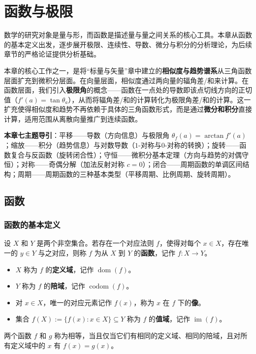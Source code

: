 \chapter{函数与极限}

\begin{remark}[本章定位]\label{rem:function_chapter_positioning}
数学的研究对象是量与形，而函数是描述量与量之间关系的核心工具。本章从函数的基本定义出发，逐步展开极限、连续性、导数、微分与积分的分析理论，为后续章节的严格论证提供分析基础。

本章的核心工作之一，是将“标量与矢量”章中建立的\textbf{相似度与趋势谱系}从三角函数层面扩充到微积分层面。在向量层面，相似度通过两向量的辐角差/和来计算。在函数层面，我们引入\textbf{极限角}的概念——函数在一点处的导数即该点切线方向的正切值（$f'(a) = \tan\theta_a$），从而将辐角差/和的计算转化为极限角差/和的计算。这一扩充使得相似度和趋势不再依赖于具体的三角函数形式，而是通过\textbf{微分和积分}直接计算，适用范围从离散向量推广到连续函数。

\textbf{本章七主题导引}：平移——导数（方向信息）与极限角 $\theta_f(a)=\arctan f'(a)$；缩放——积分（趋势信息）与对数导数（$1$-对称与$0$-对称的转换）；旋转——函数复合与反函数（旋转闭合性）；守恒——微积分基本定理（方向与趋势的对偶守恒）；对称——奇偶分解（加法反射对称 $c=0$）；闭合——周期函数的单调区间结构；周期——周期函数的三种基本类型（平移周期、比例周期、旋转周期）。
\end{remark}

\section{\texorpdfstring{函数}{函数}}

\subsection{\texorpdfstring{函数的基本定义}{函数的基本定义}}

\begin{definition}[函数]\label{def:function}
设 $X$ 和 $Y$ 是两个非空集合。若存在一个对应法则 $f$，使得对每个 $x \in X$，存在唯一的 $y \in Y$ 与之对应，则称 $f$ 为从 $X$ 到 $Y$ 的\textbf{函数}，记作 $f: X \to Y$。
\begin{itemize}
    \item $X$ 称为 $f$ 的\textbf{定义域}，记作 $\operatorname{dom}(f)$。
    \item $Y$ 称为 $f$ 的\textbf{陪域}，记作 $\operatorname{codom}(f)$。
    \item 对 $x \in X$，唯一的对应元素记作 $f(x)$，称为 $x$ 在 $f$ 下的\textbf{像}。
    \item 集合 $f(X) := \{f(x) : x \in X\} \subseteq Y$ 称为 $f$ 的\textbf{值域}，记作 $\operatorname{im}(f)$。
\end{itemize}
两个函数 $f$ 和 $g$ 称为相等，当且仅当它们有相同的定义域、相同的陪域，且对所有定义域中的 $x$ 有 $f(x)=g(x)$。
\end{definition}

